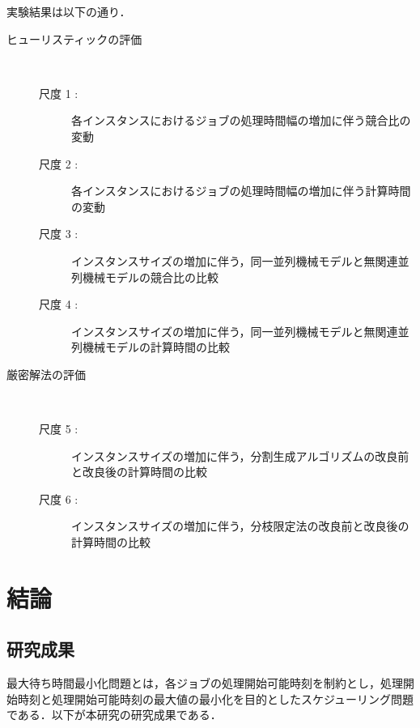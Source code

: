 \documentclass[12pt]{optlab-bachelor}
\begin{document}
実験結果は以下の通り．
\begin{description}
  \item[ヒューリスティックの評価] ~
  \begin{description}
    \item[尺度 1 :] 各インスタンスにおけるジョブの処理時間幅の増加に伴う競合比の変動
    \item[尺度 2 :] 各インスタンスにおけるジョブの処理時間幅の増加に伴う計算時間の変動
    \item[尺度 3 :] インスタンスサイズの増加に伴う，同一並列機械モデルと無関連並列機械モデルの競合比の比較
    \item[尺度 4 :] インスタンスサイズの増加に伴う，同一並列機械モデルと無関連並列機械モデルの計算時間の比較
  \end{description}
  \item[厳密解法の評価] ~
  \begin{description}
    \item[尺度 5 :] インスタンスサイズの増加に伴う，分割生成アルゴリズムの改良前と改良後の計算時間の比較
    \item[尺度 6 :] インスタンスサイズの増加に伴う，分枝限定法の改良前と改良後の計算時間の比較
  \end{description}
\end{description}

\chapter{結論}\label{c_6}
\section{研究成果}
最大待ち時間最小化問題とは，各ジョブの処理開始可能時刻を制約とし，処理開始時刻と処理開始可能時刻の最大値の最小化を目的としたスケジューリング問題である．以下が本研究の研究成果である．
\end{document}
